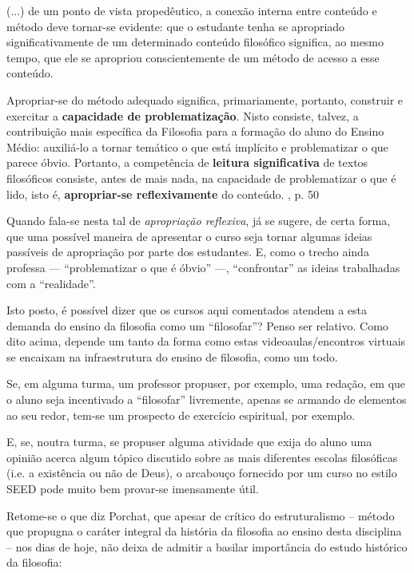 \documentclass[12pt,a4paper]{article}
\newenvironment{citac}{\begin{addmargin}[4cm]{1em} \footnotesize}{\normalfont \end{addmargin}}
\begin{document}
	\begin{citac}
	(...) de um ponto de vista propedêutico, a conexão interna entre conteúdo e método deve tornar-se evidente: que o estudante tenha se apropriado significativamente de um determinado conteúdo filosófico significa, ao mesmo tempo, que ele se apropriou conscientemente de um método de acesso a esse conteúdo.  
	
		Apropriar-se do método adequado significa, primariamente, portanto, construir e exercitar a \textbf{capacidade de problematização}. Nisto consiste, talvez, a contribuição mais específica da Filosofia para a formação do aluno do Ensino Médio: auxiliá-lo a tornar temático o que está implícito   e   problematizar   o   que   parece   óbvio.   Portanto,   a   competência   de   \textbf{leitura significativa}   de   textos   filosóficos   consiste,   antes   de   mais   nada,   na   capacidade   de   problematizar o que é lido, isto é, \textbf{apropriar-se reflexivamente} do conteúdo. 
		\cite{pcn}, p. 50
	\end{citac} 
	
	Quando fala-se nesta tal de \textit{apropriação reflexiva}, já se 
	sugere, de certa forma, que uma possível maneira de apresentar o curso 
	seja tornar algumas ideias passíveis de apropriação por parte dos 
	estudantes. E, como o trecho ainda professa --- ``problematizar o que é 
	óbvio'' ---, ``confrontar'' as ideias trabalhadas com a ``realidade''. 
	
	Isto posto, é possível dizer que os cursos aqui comentados atendem 
	a esta demanda do ensino da filosofia como um “filosofar”? Penso ser 
	relativo. Como dito acima, depende um tanto da forma como estas 
	videoaulas/encontros virtuais se encaixam na infraestrutura do 
	ensino de filosofia, como um todo. 

	Se, em alguma turma, um professor propuser, por exemplo, uma redação, 
	em que o aluno seja incentivado a “filosofar” livremente, apenas se 
	armando de elementos ao seu redor, tem-se um prospecto de exercício 
	espiritual, por exemplo. 

	E, se, noutra turma, se propuser alguma atividade que exija do 
	aluno uma opinião acerca algum tópico discutido sobre as mais 
	diferentes escolas filosóficas (i.e. a existência ou não de Deus), 
	o arcabouço fornecido por um curso no estilo SEED pode muito bem 
	provar-se imensamente útil. 

	Retome-se o que diz Porchat, que apesar de crítico do estruturalismo 
	-- método que propugna o caráter integral da história da filosofia 
	ao ensino desta disciplina -- nos dias de hoje, não deixa de admitir 
	a basilar importância do estudo histórico da filosofia: 
\end{document}
